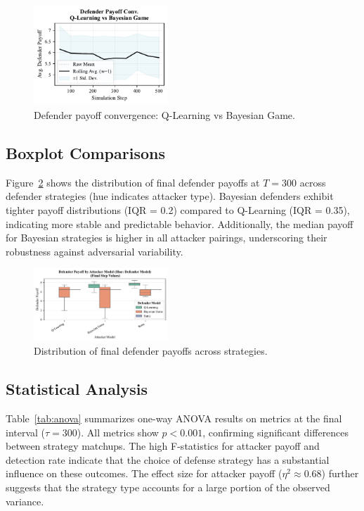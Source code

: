 \documentclass[conference]{IEEEtran}
\begin{document}
\begin{figure}[htbp]
  \centering
  \includegraphics[width=0.45\textwidth]{fig_def_convergence.pdf}
  \caption{Defender payoff convergence: Q-Learning vs Bayesian Game.}
  \label{fig:conv_db}
\end{figure}

\subsection{Boxplot Comparisons}
Figure~\ref{fig:def_box} shows the distribution of final defender payoffs at $T=300$ across defender strategies (hue indicates attacker type). Bayesian defenders exhibit tighter payoff distributions (IQR = 0.2) compared to Q-Learning (IQR = 0.35), indicating more stable and predictable behavior. Additionally, the median payoff for Bayesian strategies is higher in all attacker pairings, underscoring their robustness against adversarial variability.

\begin{figure}[htbp]
  \centering
  \includegraphics[width=0.45\textwidth]{fig_def_payoff_boxplot.pdf}
  \caption{Distribution of final defender payoffs across strategies.}
  \label{fig:def_box}   
\end{figure}

\subsection{Statistical Analysis}
Table~\ref{tab:anova} summarizes one-way ANOVA results on metrics at the final interval ($\tau=300$). All metrics show $p<0.001$, confirming significant differences between strategy matchups. The high F-statistics for attacker payoff and detection rate indicate that the choice of defense strategy has a substantial influence on these outcomes. The effect size for attacker payoff ($\eta^2 \approx 0.68$) further suggests that the strategy type accounts for a large portion of the observed variance.
\end{document}
